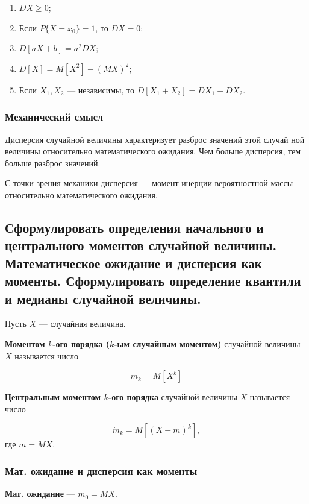 \begin{enumerate}
	\item $DX \geqslant 0$;
	\item Если $P\{X = x_{0}\} = 1$, то $DX = 0$;
	\item $D[aX + b] = a^{2}DX$;
	\item $D[X] = M[X^{2}] - (MX)^{2}$;
	\item Если $X_{1}, X_{2}$ --- независимы, то $D[X_{1} + X_{2}] = DX_{1} + DX_{2}$.
\end{enumerate}

\subsubsection*{Механический смысл}

Дисперсия случайной величины характеризует разброс значений этой случай ной величины относительно математического ожидания. Чем больше дисперсия, тем больше разброс значений.

С точки зрения механики дисперсия --- момент инерции вероятностной массы относительно математического ожидания.

\subsection{Сформулировать определения начального и центрального моментов случайной величины. Математическое ожидание и дисперсия как моменты. Сформулировать определение квантили и медианы случайной величины.}

Пусть $X$ --- случайная величина.

\textbf{Моментом $k$-ого порядка ($k$-ым случайным моментом)} случайной величины $X$ называется число

\begin{equation}
	m_{k} = M[X^{k}]
\end{equation}

\textbf{Центральным моментом $k$-ого порядка} случайной величины $X$ называется число

\begin{equation}
	\dot m_{k} = M[(X - m)^{k}],
\end{equation}
где $m = MX$.

\subsubsection*{Мат. ожидание и дисперсия как моменты}

\textbf{Мат. ожидание} --- $m_{0} = MX$.

